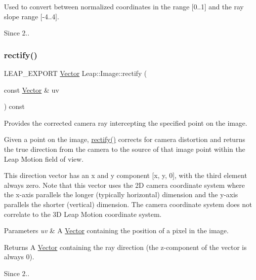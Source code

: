 Used to convert between normalized coordinates in the range \mbox{[}0..1\mbox{]} and the ray slope range \mbox{[}-\/4..4\mbox{]}.


\begin{DoxyCodeInclude}
\end{DoxyCodeInclude}


\begin{DoxySince}{Since}
2.. 
\end{DoxySince}
\mbox{\label{class_leap_1_1_image_a76443f4064feb15dad132be15f9fa444}} 
\subsubsection{\texorpdfstring{rectify()}{rectify()}}
{\footnotesize\ttfamily L\+E\+A\+P\+\_\+\+E\+X\+P\+O\+RT \hyperlink{struct_leap_1_1_vector}{Vector} Leap\+::\+Image\+::rectify (\begin{DoxyParamCaption}\item[{const \hyperlink{struct_leap_1_1_vector}{Vector} \&}]{uv }\end{DoxyParamCaption}) const}

Provides the corrected camera ray intercepting the specified point on the image.

Given a point on the image, {\ttfamily \hyperlink{class_leap_1_1_image_a76443f4064feb15dad132be15f9fa444}{rectify()}} corrects for camera distortion and returns the true direction from the camera to the source of that image point within the Leap Motion field of view.

This direction vector has an x and y component \mbox{[}x, y, 0\mbox{]}, with the third element always zero. Note that this vector uses the 2D camera coordinate system where the x-\/axis parallels the longer (typically horizontal) dimension and the y-\/axis parallels the shorter (vertical) dimension. The camera coordinate system does not correlate to the 3D Leap Motion coordinate system.


\begin{DoxyCodeInclude}
\end{DoxyCodeInclude}



\begin{DoxyParams}{Parameters}
{\em uv} & A \hyperlink{struct_leap_1_1_vector}{Vector} containing the position of a pixel in the image. \\
\hline
\end{DoxyParams}
\begin{DoxyReturn}{Returns}
A \hyperlink{struct_leap_1_1_vector}{Vector} containing the ray direction (the z-\/component of the vector is always 0). 
\end{DoxyReturn}
\begin{DoxySince}{Since}
2.. 
\end{DoxySince}
\mbox{\label{class_leap_1_1_image_a21a29c8d7006c741c72c496c673f90d5}} 
